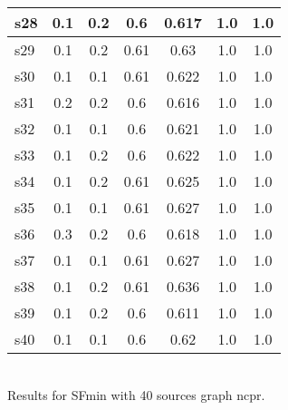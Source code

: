 \documentclass{article}
\begin{document}
\begin{tabular}{|l|c|c|c|c|c|c|}
\hline
s28 &0.1 & 0.2 & 0.6 & 0.617 & 1.0 & 1.0\\
\hline
s29 &0.1 & 0.2 & 0.61 & 0.63 & 1.0 & 1.0\\
\hline
s30 &0.1 & 0.1 & 0.61 & 0.622 & 1.0 & 1.0\\
\hline
s31 &0.2 & 0.2 & 0.6 & 0.616 & 1.0 & 1.0\\
\hline
s32 &0.1 & 0.1 & 0.6 & 0.621 & 1.0 & 1.0\\
\hline
s33 &0.1 & 0.2 & 0.6 & 0.622 & 1.0 & 1.0\\
\hline
s34 &0.1 & 0.2 & 0.61 & 0.625 & 1.0 & 1.0\\
\hline
s35 &0.1 & 0.1 & 0.61 & 0.627 & 1.0 & 1.0\\
\hline
s36 &0.3 & 0.2 & 0.6 & 0.618 & 1.0 & 1.0\\
\hline
s37 &0.1 & 0.1 & 0.61 & 0.627 & 1.0 & 1.0\\
\hline
s38 &0.1 & 0.2 & 0.61 & 0.636 & 1.0 & 1.0\\
\hline
s39 &0.1 & 0.2 & 0.6 & 0.611 & 1.0 & 1.0\\
\hline
s40 &0.1 & 0.1 & 0.6 & 0.62 & 1.0 & 1.0\\
\hline
\end{tabular}\\

\noindent Results for SFmin with 40 sources graph ncpr.
\end{document}

